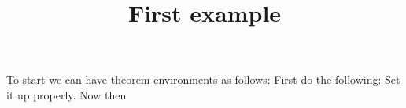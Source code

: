 \documentclass{ximera}
\title{First example}
\begin{document}
\maketitle

To start we can have theorem environments as follows:
First do the following:
Set it up properly.
Now then
\end{document}
